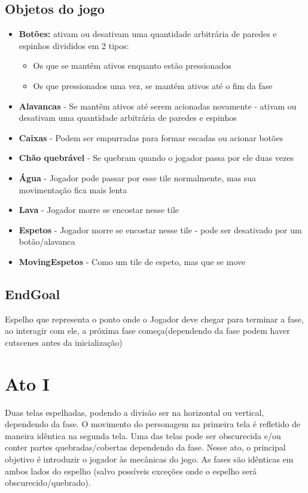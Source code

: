 \documentclass[a4paper, 11pt]{article}
\begin{document}
	\subsection{Objetos do jogo} 
		\begin{itemize} 
			\item \textbf{Botões:} ativam ou desativam uma quantidade arbitrária de paredes e espinhos divididos em 2 tipos: 
			\begin{itemize}
			        \item Os que se mantêm ativos enquanto estão pressionados
			        \item Os que pressionados uma vez, se mantém ativos até o fim da fase
			\end{itemize}   
			\item \textbf{Alavancas} - Se mantêm ativos até serem acionadas novamente - ativam ou desativam uma quantidade arbitrária de paredes e espinhos 
			\item \textbf{Caixas} - Podem ser empurradas para formar escadas ou acionar botões 
			\item \textbf{Chão quebrável} - Se quebram quando o jogador passa por ele duas vezes 
			\item \textbf{Água} - Jogador pode passar por esse tile normalmente, mas sua movimentação fica mais lenta 
			\item \textbf{Lava} - Jogador morre se encostar nesse tile 
			\item \textbf{Espetos} - Jogador morre se encostar nesse tile - pode ser desativado por um botão/alavanca
			\item \textbf{MovingEspetos} - Como um tile de espeto, mas que se move 
		\end{itemize} 
 		\subsection{EndGoal}
 			Espelho que representa o ponto onde o Jogador deve chegar para terminar a fase, ao interagir com ele, a próxima fase começa(dependendo da fase podem haver cutscenes antes da inicialização)
	
\section{Ato I} 
 
	Duas telas espelhadas, podendo a divisão ser na horizontal ou vertical, dependendo da fase. O movimento do 
	personagem na primeira tela é refletido de maneira idêntica na segunda tela. Uma das telas pode ser obscurecida 
	e/ou conter partes quebradas/cobertas dependendo da fase. 
	Nesse ato, o principal objetivo é introduzir o jogador às mecânicas do jogo. As fases são idênticas 
	em ambos lados do espelho (salvo possíveis exceções onde o espelho será obscurecido/quebrado). 
 
\end{document}
